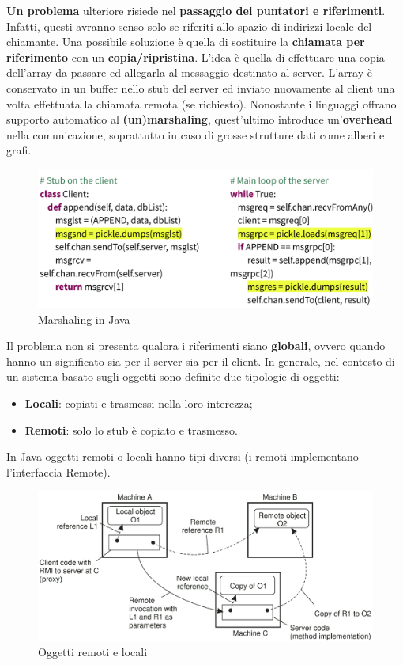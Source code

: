 \documentclass[12pt]{article}
\begin{document}
			\textbf{Un problema} ulteriore risiede nel \textbf{passaggio dei puntatori e riferimenti}. Infatti, questi avranno senso solo se riferiti allo spazio di indirizzi locale del chiamante. Una possibile soluzione è quella di sostituire la \textbf{chiamata per riferimento} con un \textbf{copia/ripristina}. L'idea è quella di effettuare una copia dell'array da passare ed allegarla al messaggio destinato al server. L'array è conservato in un buffer nello stub del server ed inviato nuovamente al client una volta effettuata la chiamata remota (se richiesto). Nonostante i linguaggi offrano supporto automatico al \textbf{(un)marshaling}, quest'ultimo introduce un'\textbf{overhead} nella comunicazione, soprattutto in caso di grosse strutture dati come alberi e grafi.
			
			\begin{figure}[h!]
				\centering
				\includegraphics[scale=0.25]{img/rpccode.png}
				\caption{Marshaling in Java  }
			\end{figure}   
		
			Il problema non si presenta qualora i riferimenti siano \textbf{globali}, ovvero quando hanno un significato sia per il server sia per il client. \newline
			In generale, nel contesto di un sistema basato sugli oggetti sono definite due tipologie di oggetti:
			\begin{itemize}
				\item \textbf{Locali}: copiati e trasmessi nella loro interezza;
				\item \textbf{Remoti}: solo lo stub è copiato e trasmesso. 
			\end{itemize}
			In Java oggetti remoti o locali hanno tipi diversi (i remoti implementano l'interfaccia Remote).
			\begin{figure}[h!]
				\centering
				\includegraphics[scale=0.25]{img/remotelocal.png}
				\caption{Oggetti remoti e locali  }
			\end{figure}
		
\end{document}
